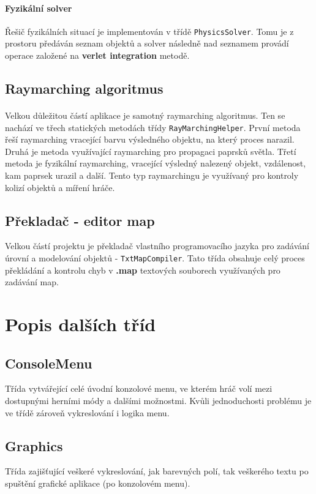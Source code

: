 \documentclass[a4paper, 12pt]{article}
\begin{document}
\paragraph{Fyzikální solver}
Řešič fyzikálních situací je implementován v třídě \texttt{PhysicsSolver}.
Tomu je z prostoru předáván seznam objektů a solver následně nad seznamem
provádí operace založené na \textbf{verlet integration} metodě.

\subsection{Raymarching algoritmus}
\paragraph{} 
Velkou důležitou částí aplikace je samotný raymarching algoritmus. Ten se
nachází ve třech statických metodách třídy \texttt{RayMarchingHelper}. První
metoda řeší raymarching vracející barvu výsledného objektu, na který proces
narazil. Druhá je metoda využívající raymarching pro propagaci paprsků světla.
Třetí metoda je fyzikální raymarching, vracející výsledný nalezený objekt,
vzdálenost, kam paprsek urazil a další. Tento typ raymarchingu je využívaný pro
kontroly kolizí objektů a míření hráče.

\subsection{Překladač - editor map}
Velkou částí projektu je překladač vlastního programovacího jazyka pro zadávání
úrovní a modelování objektů - \texttt{TxtMapCompiler}. Tato třída obsahuje celý
proces překládání a kontrolu chyb v \textbf{.map} textových souborech využívaných
pro zadávání map.

\section{Popis dalších tříd}
\subsection{ConsoleMenu}
Třída vytvářející celé úvodní konzolové menu, ve kterém hráč volí mezi
dostupnými herními módy a dalšími možnostmi. Kvůli jednoduchosti problému je ve 
třídě zároveň vykreslování i logika menu.

\subsection{Graphics}
Třída zajišťující veškeré vykreslování, jak barevných polí, tak veškerého textu
po spuštění grafické aplikace (po konzolovém menu).
\end{document}
